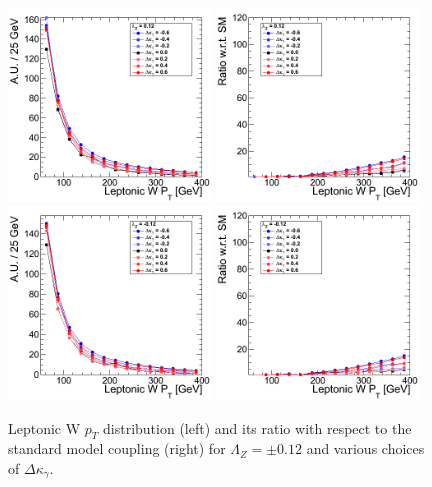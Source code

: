\begin{figure}[h!t]
  {\centering
    \includegraphics[width=0.48\textwidth]{figs/LeptonicWpT_012.png}
    \includegraphics[width=0.48\textwidth]{figs/LeptonicWpT_012_ratio.png}
    \includegraphics[width=0.48\textwidth]{figs/LeptonicWpT_m012.png}
    \includegraphics[width=0.48\textwidth]{figs/LeptonicWpT_m012_ratio.png}
    \caption{Leptonic W $p_T$ distribution (left) and its ratio with respect to 
    the standard model coupling (right) for $\Lambda_Z = \pm 0.12$ and various choices of $\Delta{\kappa_\gamma}$.}
    \label{fig:ww_LeptonicWpT_atgcRatio012}}
\end{figure}
